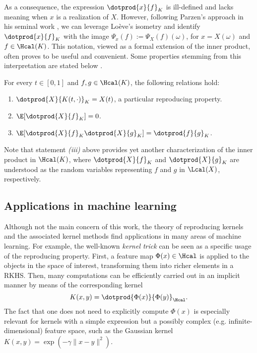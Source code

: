 As a consequence, the expression \(\dotprod{x}{f}_K\) is ill-defined and lacks meaning when \(x\) is a realization of \(X\). However, following Parzen's approach in his seminal work \citep[e.g.][Th.~4E]{parzen1961approach}, we can leverage Loève's isometry and identify \(\dotprod{x}{f}_K \) with the image \( \Psi_x(f) := \Psi_X(f)(\omega)\), for \(x=X(\omega)\) and \(f\in \Hcal(K)\). This notation, viewed as a formal extension of the inner product, often proves to be useful and convenient. Some properties stemming from this interpretation are stated below \citep[see][p.~974]{parzen1961approach}.

\setlength{\headsep}{21.75pt}

\begin{proposition}
  For every \(t\in[0,1]\) and \(f, g \in \Hcal(K)\), the following relations hold:
\begin{enumerate}
  \item \(\dotprod{X}{K(t, \cdot)}_K = X(t)\), a particular reproducing property.
  \item \(\E[\dotprod{X}{f}_K] = 0\).
  \item \(\E[\dotprod{X}{f}_K\dotprod{X}{g}_K] = \dotprod{f}{g}_K\).
\end{enumerate}
\end{proposition}
Note that statement \textit{(iii)} above provides yet another characterization of the inner product in \(\Hcal(K)\), where \(\dotprod{X}{f}_K\) and \(\dotprod{X}{g}_K\) are understood as the random variables representing \(f\) and \(g\) in \(\Lcal(X)\), respectively.


\subsection*{Applications in machine learning}

Although not the main concern of this work, the theory of reproducing kernels and the associated kernel methods find applications in many areas of machine learning. For example, the well-known \textit{kernel trick} can be seen as a specific usage of the reproducing property. First, a feature map \(\Phi(x) \in \Hcal\) is applied to the objects in the space of interest, transforming them into richer elements in a RKHS. Then, many computations can be efficiently carried out in an implicit manner by means of the corresponding kernel
\[
K(x, y)=\dotprod{\Phi(x)}{\Phi(y)}_{\Hcal}.
\]
The fact that one does not need to explicitly compute \(\Phi(x)\) is especially relevant for kernels with a simple expression but a possibly complex (e.g. infinite-dimensional) feature space, such as the Gaussian kernel \(K(x, y)=\exp(-\gamma\|x-y\|^2)\).

